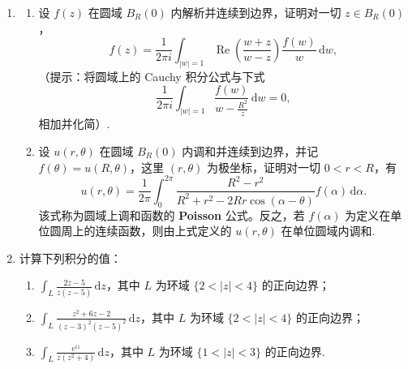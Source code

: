 \documentclass[openany,oneside]{ctexbook}
\begin{document}
\begin{enumerate}
\item 
\begin{enumerate}
\item[(1)] 设 \( f(z) \) 在圆域 \( B_R(0) \) 内解析并连续到边界，证明对一切 \( z \in B_R(0) \)，
\[f(z) = \frac{1}{2\pi i} \int_{|w|=1} \operatorname{Re} \left( \frac{w+z}{w-z} \right) \frac{f(w)}{w} \, \mathrm{d}w,\]
（提示：将圆域上的 Cauchy 积分公式与下式
\[\frac{1}{2\pi i} \int_{|w|=1} \frac{f(w)}{w - \frac{R^2}{z}} \, \mathrm{d}w = 0,\]
相加并化简）.

\item[(2)] 设 \( u(r, \theta) \) 在圆域 \( B_R(0) \) 内调和并连续到边界，并记 \( f(\theta) = u(R, \theta) \)，这里 \( (r, \theta) \) 为极坐标，证明对一切 \( 0 < r < R \)，有
\[u(r, \theta) = \frac{1}{2\pi} \int_0^{2\pi} \frac{R^2 - r^2}{R^2 + r^2 - 2Rr \cos(\alpha - \theta)} f(\alpha) \, \mathrm{d}\alpha.\]
该式称为圆域上调和函数的 \textbf{Poisson} 公式。反之，若 \( f(\alpha) \) 为定义在单位圆周上的连续函数，则由上式定义的 \( u(r, \theta) \) 在单位圆域内调和.
\end{enumerate}

\item 计算下列积分的值：
\begin{enumerate}
\item \(\displaystyle \int_L \frac{2z - 5}{z(z - 5)} \, \mathrm{d}z\)，其中 \( L \) 为环域 \(\{2 < |z| < 4\}\) 的正向边界；
\item \(\displaystyle \int_L \frac{z^2 + 6z - 2}{(z - 3)^2(z - 5)^2} \, \mathrm{d}z\)，其中 \( L \) 为环域 \(\{2 < |z| < 4\}\) 的正向边界；
\item \(\displaystyle \int_L \frac{e^{iz}}{z(z^2 + 4)} \, \mathrm{d}z\)，其中 \( L \) 为环域 \(\{1 < |z| < 3\}\) 的正向边界.
\end{enumerate}
\end{enumerate}
\end{document}
